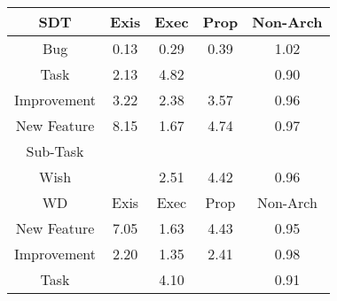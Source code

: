 \begin{tabular}{|c||c|c|c|c|}
\hline
\hline
SDT & Exis & Exec & Prop & Non-Arch \\ 
\hline
Bug & \cellcolor[rgb]{0.7648725630827199,0.1530634652582075,0.2845477255438719} 0.13 & \cellcolor[rgb]{0.7909112621752048,0.2763133076293023,0.3088505113635244} 0.29 & \cellcolor[rgb]{0.8085869204645106,0.3599780901986832,0.32534779243354317} 0.39 & \cellcolor[rgb]{0.9093044683989797,0.8396705376626744,0.42} 1.02 \\ 
\hline
Task & \cellcolor[rgb]{0.8700157476954358,0.8210600910136274,0.42} 2.13 & \cellcolor[rgb]{0.7749425429253993,0.776025415069926,0.42} 4.82 &  & \cellcolor[rgb]{0.8941087879398946,0.7647815962488341,0.4051682020772349} 0.90 \\ 
\hline
Improvement & \cellcolor[rgb]{0.8315437553256143,0.8028365156805541,0.42} 3.22 & \cellcolor[rgb]{0.8611761055263292,0.816872892091419,0.42} 2.38 & \cellcolor[rgb]{0.8191467433982904,0.7969642468728744,0.42} 3.57 & \cellcolor[rgb]{0.9031747973051567,0.8076940405777416,0.41362981081814626} 0.96 \\ 
\hline
New Feature & \cellcolor[rgb]{0.6572474524201206,0.7202751090411097,0.42} 8.15 & \cellcolor[rgb]{0.8863291425061054,0.8287874885555235,0.42} 1.67 & \cellcolor[rgb]{0.7777037992782727,0.7773333786054976,0.42} 4.74 & \cellcolor[rgb]{0.9042761769360372,0.8129072374972427,0.4146577651403014} 0.97 \\ 
\hline
Sub-Task &  &  &  &  \\ 
\hline
Wish &  & \cellcolor[rgb]{0.85651265813752,0.8146638906967199,0.41999999999999993} 2.51 & \cellcolor[rgb]{0.7890465312206311,0.7827062516308252,0.42} 4.42 & \cellcolor[rgb]{0.9031350051352239,0.8075056909733931,0.4135926714595423} 0.96 \\ 
\hline
\hline
WD & Exis & Exec & Prop & Non-Arch \\ 
\hline
New Feature & \cellcolor[rgb]{0.6960888186772449,0.7386736509523792,0.42} 7.05 & \cellcolor[rgb]{0.8877873038000205,0.8294781965368518,0.42} 1.63 & \cellcolor[rgb]{0.7888071597190597,0.7825928651300809,0.42} 4.43 & \cellcolor[rgb]{0.9013875144251984,0.7992342349459389,0.41196168013018514} 0.95 \\ 
\hline
Improvement & \cellcolor[rgb]{0.8676127593001479,0.8199218333527016,0.42} 2.20 & \cellcolor[rgb]{0.8977453295202942,0.8341951560885603,0.42} 1.35 & \cellcolor[rgb]{0.8601546087130463,0.816389025179864,0.42000000000000004} 2.41 & \cellcolor[rgb]{0.9069837375529635,0.8257230244173602,0.4171848217160992} 0.98 \\ 
\hline
Task &  & \cellcolor[rgb]{0.8004012905417088,0.7880848218355463,0.42} 4.10 &  & \cellcolor[rgb]{0.8955021514685637,0.7713768502845344,0.40646867470399267} 0.91 \\ 

\end{tabular}
